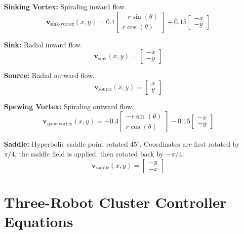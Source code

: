 \documentclass[lettersize,journal]{IEEEtran}
\begin{document}
\textbf{Sinking Vortex:} Spiraling inward flow.
\begin{equation}
\mathbf{v}_{\text{sink-vortex}}(x, y) = 0.4 \begin{bmatrix} -r \sin(\theta) \\ r \cos(\theta) \end{bmatrix} + 0.15 \begin{bmatrix} -x \\ -y \end{bmatrix}
\end{equation}

\textbf{Sink:} Radial inward flow.
\begin{equation}
\mathbf{v}_{\text{sink}}(x, y) = \begin{bmatrix} -x \\ -y \end{bmatrix}
\end{equation}

\textbf{Source:} Radial outward flow.
\begin{equation}
\mathbf{v}_{\text{source}}(x, y) = \begin{bmatrix} x \\ y \end{bmatrix}
\end{equation}

\textbf{Spewing Vortex:} Spiraling outward flow.
\begin{equation}
\mathbf{v}_{\text{spew-vortex}}(x, y) = -0.4 \begin{bmatrix} -r \sin(\theta) \\ r \cos(\theta) \end{bmatrix} - 0.15 \begin{bmatrix} -x \\ -y \end{bmatrix}
\end{equation}

\textbf{Saddle:} Hyperbolic saddle point rotated $45^\circ$. Coordinates are first rotated by $\pi/4$, the saddle field is applied, then rotated back by $-\pi/4$:
\begin{equation}
\mathbf{v}_{\text{saddle}}(x, y) = \begin{bmatrix} -y \\ -x \end{bmatrix}
\end{equation}

\section{Three-Robot Cluster Controller Equations}
\end{document}
